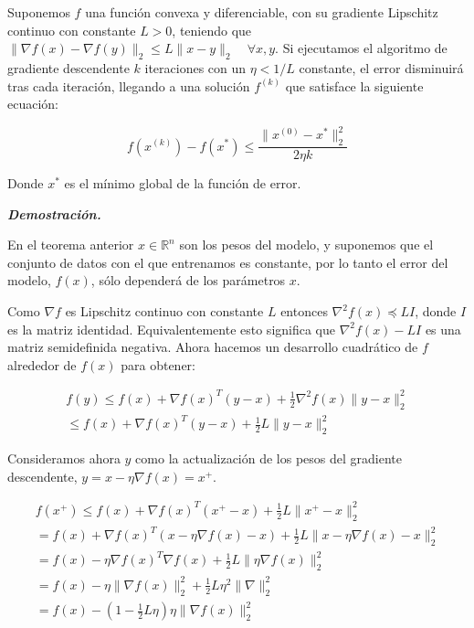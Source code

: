 \begin{teorema}\label{proof:gdconvex}
    Suponemos $f$ una función convexa y diferenciable, con su gradiente Lipschitz continuo con constante $L>0$, teniendo que $\| \nabla f(x) - \nabla f(y) \|_2 \leq L \|x-y\|_2 \quad \forall x, y$. Si ejecutamos el algoritmo de gradiente descendente $k$ iteraciones con un $\eta<1/L$ constante, el error disminuirá tras cada iteración, llegando a una solución $f^{(k)}$ que satisface la siguiente ecuación:

    $$f(x^{(k)})-f(x^*) \leq \frac{\|x^{(0)}-x^* \|^2_2}{2\eta k}$$

    Donde $x^*$ es el mínimo global de la función de error. 
\end{teorema}

\vspace{1cm}

\begin{flushleft}
   \textbf{\textit{Demostración.}}
\end{flushleft} 



En el teorema anterior $x \in \mathbb{R}^n$ son los pesos del modelo, y suponemos que el conjunto de datos con el que entrenamos es constante, por lo tanto el error del modelo, $f(x)$, sólo dependerá de los parámetros $x$.

Como $\nabla f$ es Lipschitz continuo con constante $L$ entonces $\nabla ^2 f(x) \preceq LI$, donde $I$ es la matriz identidad. Equivalentemente esto significa que $\nabla ^2 f(x) -LI$ es una matriz semidefinida negativa. Ahora hacemos un desarrollo cuadrático de $f$ alrededor de $f(x)$ para obtener:

\begin{gather*}
    f(y) \leq f(x) + \nabla f(x)^T (y-x) +\frac{1}{2}\nabla^2 f(x) \|y-x\|^2_2  \\
    \leq f(x) + \nabla f(x)^T(y-x) + \frac{1}{2}L \|y - x \|^2_2
\end{gather*}

Consideramos ahora $y$ como la actualización de los pesos del gradiente descendente, $y=x - \eta \nabla f(x)=x^+$. 


\begin{gather*}
    f(x^+) \leq f(x) + \nabla f(x)^T(x^+-x) + \frac{1}{2}L \|x^+ - x \|^2_2 \\
    = f(x) + \nabla f(x)^T(x - \eta \nabla f(x) -x) + \frac{1}{2}L \|x - \eta \nabla f(x) - x \|^2_2 \\
    = f(x) - \eta \nabla f(x)^T \nabla f(x) + \frac{1}{2} L \| \eta \nabla f(x) \|^2_2 \\
    = f(x) - \eta \| \nabla f(x) \|^2_2 + \frac{1}{2} L \eta^2 \| \nabla \|^2_2 \\
    = f(x) - (1- \frac{1}{2}L \eta) \eta \| \nabla f(x) \|^2_2
\end{gather*}

